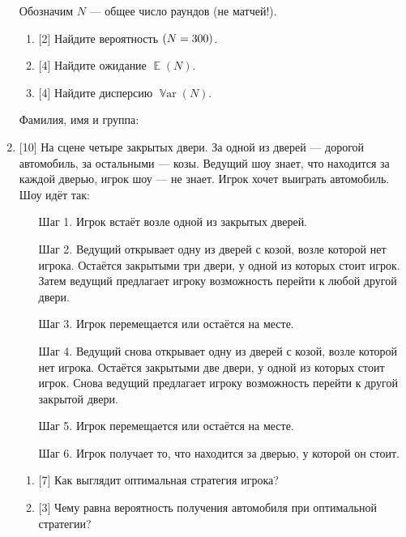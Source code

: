 \documentclass[12pt]{article}
\DeclareMathOperator{\Var}{\mathbb{V}ar}
\let\P\relax
\DeclareMathOperator{\P}{\mathbb{P}}
\DeclareMathOperator{\E}{\mathbb{E}}
\begin{document}
\begin{enumerate}
    Обозначим $N$ — общее число раундов (не матчей!). 

    \begin{enumerate}
        \item {[2]} Найдите вероятность $\P(N = 300)$.
        \item {[4]} Найдите ожидание $\E(N)$.
        \item {[4]} Найдите дисперсию $\Var(N)$.
    \end{enumerate}

    \vspace{10pt}
    Фамилия, имя и группа: \dotfill

    \newpage



    

    \item {[10]} На сцене четыре закрытых двери. 
    За одной из дверей — дорогой автомобиль, за остальными — козы. 
    Ведущий шоу знает, что находится за каждой дверью, игрок шоу — не знает.
    Игрок хочет выиграть автомобиль. 
    Шоу идёт так:

    \begin{enumerate}
        \item[Шаг 1.] Игрок встаёт возле одной из закрытых дверей.
        
        \item[Шаг 2.] Ведущий открывает одну из дверей с козой, возле которой нет игрока.
        Остаётся закрытыми три двери, у одной из которых стоит игрок. 
        Затем ведущий предлагает игроку возможность перейти к любой другой двери.

        \item[Шаг 3.] Игрок перемещается или остаётся на месте.

        \item[Шаг 4.] Ведущий снова открывает одну из дверей с козой, возле которой нет игрока.
        Остаётся закрытыми две двери, у одной из которых стоит игрок.
        Снова ведущий предлагает игроку возможность перейти к другой закрытой двери.

        \item[Шаг 5.] Игрок перемещается или остаётся на месте.    
        \item[Шаг 6.] Игрок получает то, что находится за дверью, у которой он стоит.
    \end{enumerate}
    
    \begin{enumerate}
        \item {[7]} Как выглядит оптимальная стратегия игрока?
        \item {[3]} Чему равна вероятность получения автомобиля при оптимальной стратегии?
    \end{enumerate}
    


\end{enumerate}
\end{document}
